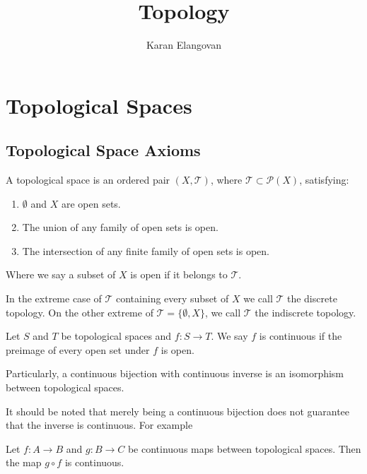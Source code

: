 \documentclass[]{article}
\title{Topology}
\author{Karan Elangovan}
\begin{document}
\maketitle

\doublespacing
\tableofcontents

\section{Topological Spaces}

\subsection{Topological Space Axioms}

\begin{defi} 
		A topological space is an ordered pair $(X, \mathcal{T})$, where $\mathcal{T} \subset \mathcal{P}(X)$, satisfying:
		\begin{enumerate}
				\item  $\emptyset$ and $X$ are open sets.
				\item The union of any family of open sets is open.
				\item The intersection of any finite family of open sets is open.
		\end{enumerate}
		Where we say a subset of $X$ is open if it belongs to $\mathcal{T}$.

		In the extreme case of $\mathcal{T}$ containing every subset of $X$ we call $\mathcal{T}$ the discrete topology. On the other extreme of $\mathcal{T} = \{\emptyset, X\}$, we call $\mathcal{T}$ the indiscrete topology.
\end{defi} 

\begin{defi} [Continuity]
	Let $S$ and $T$ be topological spaces and $f: S \to T$. We say $f$ is continuous if the preimage of every open set under $f$ is open.
\end{defi}

Particularly, a continuous bijection with continuous inverse is an isomorphism between topological spaces. 

It should be noted that merely being a continuous bijection does not guarantee that the inverse is continuous. For example

\begin{thm} 
	Let $f: A \to B$ and $g: B \to C$ be continuous maps between topological spaces. Then the map $g \circ f$ is continuous. 
\end{thm}
\end{document}
